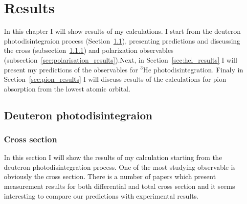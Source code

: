 \chapter{Results}\label{chap:results}

    In this chapter I will show results of my calculations. I start from the deuteron photodisintegraion process
    (Section~\ref{sec:de_results}),
    presenting predictions and discussing the cross (subsection~\ref{sec:cross_results}) 
    and polarization observables  (subsection~\ref{sec:polarisation_results}).Next, in 
    Section~\ref{sec:hel_results} I will present my predictions of the observables
    for $^3$He photodisintegration.
    Finaly in Section~\ref{sec:pion_results} I will discuss results of the calculations
    for pion absorption from the lowest atomic orbital.

\section{Deuteron photodisintegraion}
\label{sec:de_results}
    \subsection{Cross section}
    \label{sec:cross_results}

    In this section I will show the results of my calculation starting from the
    deuteron photodisintegration process. One of the most
    studying observable is obviously the cross section. There is
    a number of papers which present 
    measurement results for both differential and total cross section
    \cite{BOSMAN1979,ARENDS1984,Skopik1974, Moreh1989, Birenbaum1985, Bernabei1986, rachek2007,Ying_Experiment_Deut, DeSanctis_Experiment_Deut} 
    and it seems interesting to compare 
    our predictions with experimental results.

